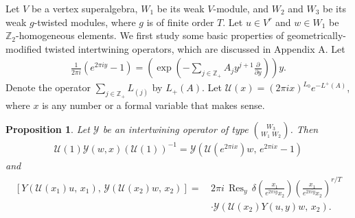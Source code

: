 \documentclass[9pt]{amsart}
\newtheorem{proposition}{Proposition}[section]
\newcommand{\Z}{\mathbb{Z}}      %
\begin{document}
Let $V$ be a vertex superalgebra, $W_1$ be its weak $V$-module, and $W_2$ and $W_3$ be its weak $g$-twisted modules, where $g$ is of finite order $T$. Let $u\in V^{r}$ and $w\in W_1$ be $\mathbb{Z}_2$-homogeneous elements. We first study some basic properties of geometrically-modified twisted intertwining operators, which are discussed in Appendix A.  Let 
\begin{align*}
  \frac{1}{2\pi i}(e^{2\pi i y}-1)=\left(\exp\left(-\sum_{j\in\mathbb{Z}_{+}}A_{j}y^{j+1}\frac{\partial}{\partial y}\right)\right)y.
\end{align*}
Denote the operator $\sum_{j\in \Z_{+}}L_{(j)}$ by $L_+(A)$.  
Let $\mathcal{U}(x)=(2\pi i x)^{L_{0}}e^{-L^+(A)}$, where $x$ is any number or a formal variable that makes sense.
\begin{proposition}
Let $\mathcal{Y}$ be an intertwining operator of type $\binom{W_3}{W_1\;W_2}$. Then
\begin{align}\label{coorcha}
\mathcal{U}(1)\mathcal{Y}(w,x)(\mathcal{U}(1))^{-1}=\mathcal{Y}\left(\mathcal{U}(e^{2\pi i x})w,\, e^{2\pi i x}-1\right)
\end{align}
and
\begin{align}\label{coorcha1}
\begin{split}
\left[Y\left(\mathcal{U}(x_{1})u,\, x_{1}\right),\, 
\mathcal{Y}\left(\mathcal{U}(x_{2})w,\, x_{2}\right)\right]
=\, & 2\pi i\, \operatorname{Res}_{y}\, 
\delta\left(\frac{x_{1}}{e^{2\pi i y}x_{2}}\right)
\left(\frac{x_{1}}{e^{2\pi i y}x_{2}}\right)^{r/T} \\
& \cdot \mathcal{Y}\left(\mathcal{U}(x_{2})Y(u,y)w,\, x_{2}\right).
\end{split}
\end{align}
\end{proposition}
\end{document}
